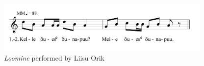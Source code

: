 %




\begin{figure}[htbp]
\begin{center}
\includegraphics[width=300pt]{figures/077.png}
\caption{{\it Loomine} performed by Liisu Orik }
\label{77}
\end{center}
\end{figure}

%






%
%
%
